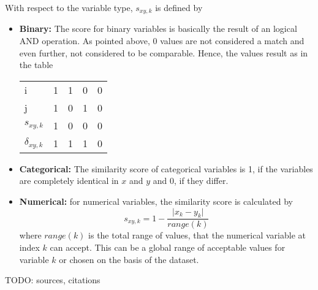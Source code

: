 \documentclass[11pt]{article}
\begin{document}
With respect to the variable type, $s_{xy,k}$ is defined by
\begin{itemize}
	\item \textbf{Binary:} The score for binary variables is basically the result of an logical AND operation. As pointed above, 0 values are not considered a match and even further, not considered to be comparable. Hence, the values result as in the table
	\begin{center}\begin{tabular}{l | c c c r}
		i & 1 & 1 & 0 & 0 \\
		j & 1 & 0 & 1 & 0 \\
		\hline
		$s_{xy,k}$ & 1 & 0 & 0 & 0 \\
		$\delta_{xy,k}$ & 1 & 1 & 1 & 0
	\end{tabular}\end{center} 
    
    \item \textbf{Categorical:} The similarity score of categorical variables is 1, if the variables are completely identical in $x$ and $y$ and 0, if they differ.
    
    \item \textbf{Numerical:} for numerical variables, the similarity score is calculated by
    \begin{equation}
      s_{xy,k} = 1 - \frac{\vert x_k - y_k \vert}{range(k)}
    \end{equation}
    where $range(k)$ is the total range of values, that the numerical variable at index $k$ can accept. This can be a global range of acceptable values for variable $k$ or chosen on the basis of the dataset.
\end{itemize}
TODO: sources, citations
\end{document}

